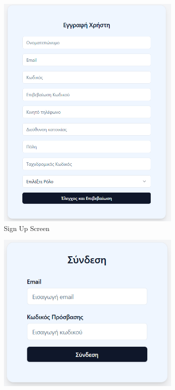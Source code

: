 \documentclass[12pt,a4paper,twoside]{book}
\begin{document}
\begin{figure}[H]
    \centering
    \begin{subfigure}[b]{0.48\textwidth}
        \centering
        \includegraphics[width=\textwidth]{Resources/Mockup Screens/mockup-register.png}
        \caption{Sign Up Screen}\label{fig:mockup1}
    \end{subfigure}
    \hfill
    \begin{subfigure}[b]{0.48\textwidth}
        \centering
        \includegraphics[width=\textwidth]{Resources/Mockup Screens/mockup-login1.png}

\end{subfigure}
\end{figure}
\end{document}
